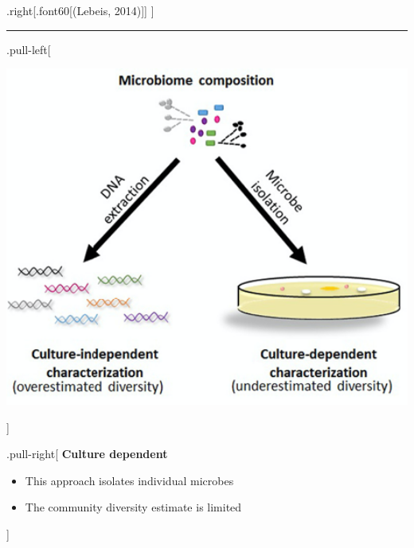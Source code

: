 \documentclass[
]{article}
\begin{document}
.right{[}.font60{[}(Lebeis, 2014){]}{]} {]}

\begin{center}\rule{0.5\linewidth}{0.5pt}\end{center}

.pull-left{[}

\begin{center}\includegraphics[width=520px]{images/microbiotaCompositionTecniques} \end{center}

{]}

.pull-right{[} \textbf{Culture dependent}

\begin{itemize}
\item
  This approach isolates individual microbes
\item
  The community diversity estimate is limited
\end{itemize}

{]}
\end{document}

